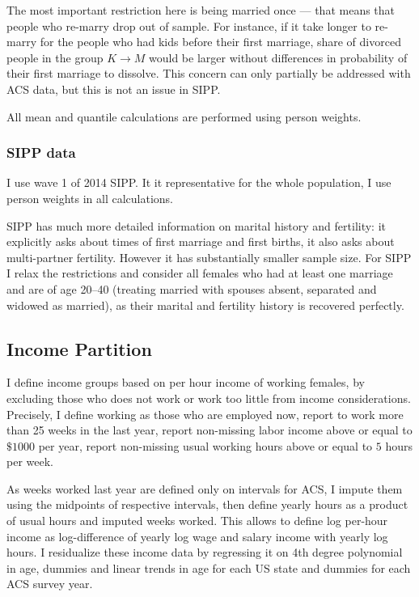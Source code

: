 \documentclass[12pt,letter]{article}
\begin{document}
The most important restriction here is being married once --- that means that people who re-marry drop out of sample. For instance, if it take longer to re-marry for the people who had kids before their first marriage, share of divorced people in the group $K\to M$ would be larger without differences in probability of their first marriage to dissolve. This concern can only partially be addressed with ACS data, but this is not an issue in SIPP. 


All mean and quantile calculations are performed using person weights.

\subsubsection{SIPP data}

I use wave 1 of 2014 SIPP. It it representative for the whole population, I use person weights in all calculations.

SIPP has much more detailed information on marital history and fertility: it explicitly asks about times of first marriage and first births, it also asks about multi-partner fertility. However it has substantially smaller sample size. For SIPP I relax the restrictions and consider all females who had at least one marriage and are of age 20--40 (treating married with spouses absent, separated and widowed as married), as their marital and fertility history is recovered perfectly.


\subsection{Income Partition\label{inc-part}}
I define income groups based on per hour income of working females, by excluding those who does not work or work too little from income considerations. Precisely, I define working as those who are employed now, report to work more than 25 weeks in the last year, report non-missing labor income above or equal to $\$1000$ per year, report non-missing usual working hours above or equal to $5$ hours per week.

As weeks worked last year are defined only on intervals for ACS, I impute them using the midpoints of respective intervals, then define yearly hours as a product of usual hours and imputed weeks worked. This allows to define log per-hour income as log-difference of yearly log wage and salary income with yearly log hours. I residualize these income data by regressing it on 4th degree polynomial in age, dummies and linear trends in age for each US state and dummies for each ACS survey year.
\end{document}
